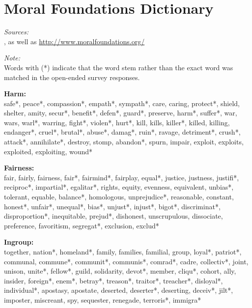 \documentclass[12pt]{article}
\begin{document}
\clearpage\flushleft\footnotesize
\appendices
\section{Moral Foundations Dictionary}
\renewcommand\thefigure{\thesection.\arabic{figure}}
\renewcommand\thetable{\thesection.\arabic{table}}
\setcounter{figure}{0}
\setcounter{table}{0}

\textit{Sources:}\\
\citet{graham2009liberals}, as well as \url{http://www.moralfoundations.org/}
\vspace{.5cm}

\textit{Note:}\\
Words with (*) indicate that the word stem rather than the exact word was matched in the open-ended survey responses.
\vspace{.5cm}

\textbf{Harm:}\\
safe*, peace*, compassion*, empath*, sympath*, care, caring, protect*, shield, shelter, amity, secur*, benefit*, defen*, guard*, preserve, harm*, suffer*, war, wars, warl*, warring, fight*, violen*, hurt*, kill, kills, killer*, killed, killing, endanger*, cruel*, brutal*, abuse*, damag*, ruin*, ravage, detriment*, crush*, attack*, annihilate*, destroy, stomp, abandon*, spurn, impair, exploit, exploits, exploited, exploiting, wound*
\vspace{.5cm}

\textbf{Fairness:}\\
fair, fairly, fairness, fair*, fairmind*, fairplay, equal*, justice, justness, justifi*, reciproc*, impartial*, egalitar*, rights, equity, evenness, equivalent, unbias*, tolerant, equable, balance*, homologous, unprejudice*, reasonable, constant, honest*, unfair*, unequal*, bias*, unjust*, injust*, bigot*, discriminat*, disproportion*, inequitable, prejud*, dishonest, unscrupulous, dissociate, preference, favoritism, segregat*, exclusion, exclud*
\vspace{.5cm}

\textbf{Ingroup:}\\
together, nation*, homeland*, family, families, familial, group, loyal*, patriot*, communal, commune*, communit*, communis*, comrad*, cadre, collectiv*, joint, unison, unite*, fellow*, guild, solidarity, devot*, member, cliqu*, cohort, ally, insider, foreign*, enem*, betray*, treason*, traitor*, treacher*, disloyal*, individual*, apostasy, apostate, deserted, deserter*, deserting, deceiv*, jilt*, imposter, miscreant, spy, sequester, renegade, terroris*, immigra*
\vspace{.5cm}
\end{document}
